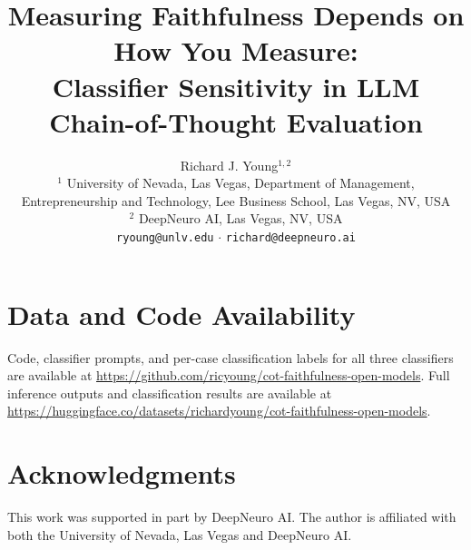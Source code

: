 \documentclass{article}
\title{Measuring Faithfulness Depends on How You Measure: \\ Classifier Sensitivity in LLM Chain-of-Thought Evaluation}
\author{
  Richard J. Young$^{1,2}$ \\[4pt]
  $^1$ University of Nevada, Las Vegas, Department of Management, \\
  Entrepreneurship and Technology, Lee Business School, Las Vegas, NV, USA \\
  $^2$ DeepNeuro AI, Las Vegas, NV, USA \\[2pt]
  \texttt{ryoung@unlv.edu} $\cdot$ \texttt{richard@deepneuro.ai} \\
}
\begin{document}
\maketitle

\begin{abstract}

\end{abstract}







\section*{Data and Code Availability}
Code, classifier prompts, and per-case classification labels for all three classifiers are available at \url{https://github.com/ricyoung/cot-faithfulness-open-models}.
Full inference outputs and classification results are available at \url{https://huggingface.co/datasets/richardyoung/cot-faithfulness-open-models}.

\section*{Acknowledgments}
This work was supported in part by DeepNeuro AI. The author is affiliated with both the University of Nevada, Las Vegas and DeepNeuro AI.



\end{document}
